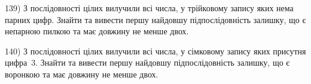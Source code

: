 \documentclass[12pt, ukrainian]{article}
\begin{document}
\par
\vspace{0.9cm}
139) \space 
З послідовності цілих вилучили всі числа, у трійковому запису яких нема парних цифр. Знайти та вивести першу найдовшу підпослідовність залишку, що є непарною пилкою та має довжину не менше двох.

\par
\vspace{0.9cm}
140) \space 
З послідовності цілих вилучили всі числа, у сімковому запису яких присутня цифра~3. Знайти та вивести першу найдовшу підпослідовність залишку, що є воронкою та має довжину не менше двох.

\par
\newpage
\end{document}

